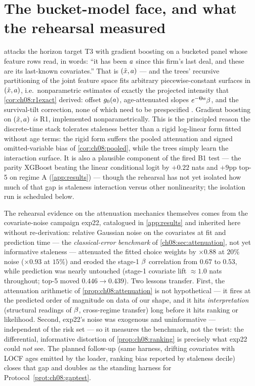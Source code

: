 \section{The bucket-model face, and what the rehearsal measured}
\label{ch08:sec:buckets}

 attacks the horizon target T3 with gradient boosting
on a bucketed panel whose feature rows read, in words: ``it has been
$a$ since this firm's last deal, and these are its last-known
covariates.'' That is $(\tilde{x}, a)$ --- and the trees'
recursive partitioning of the joint feature space fits arbitrary
piecewise-constant surfaces in $(\tilde{x}, a)$, i.e.\
nonparametric estimates of exactly the projected intensity that
\cref{cor:ch08:r1exact} derived: offset $g_0(a)$,
age-attenuated slopes $e^{-\Theta a}\beta$, and the survival-tilt
correction, none of which need to be prespecified
\citep{friedman2001,chenguestrin2016}. Gradient boosting on
$(\tilde{x}, a)$ \emph{is} R1, implemented nonparametrically.
This is the principled reason the discrete-time stack tolerates
staleness better than a rigid log-linear form fitted without age terms:
the rigid form suffers the pooled attenuation and signed
omitted-variable bias of \cref{cor:ch08:pooled}, while the trees simply
learn the interaction surface. It is also a plausible component of the
fired B1 test --- the parity XGBoost beating the linear conditional
logit by $+0.22$ nats and $+9$pp top-5 on regime A
(\cref{app:results}) --- though the rehearsal has not yet isolated how
much of that gap is staleness interaction versus other nonlinearity;
the isolation run is scheduled below.

The rehearsal evidence on the attenuation mechanics themselves comes
from the covariate-noise campaign exp22, catalogued in
\cref{app:results} and inherited here without re-derivation: relative
Gaussian noise on the covariates at fit and prediction time --- the
\emph{classical-error benchmark} of \cref{ch08:sec:attenuation}, not yet
informative staleness --- attenuated the fitted choice weights by
$\times 0.88$ at $20\%$ noise ($\times 0.93$ at $15\%$) and eroded the
stage-1 $\beta$ correlation from $0.67$ to $0.53$, while prediction was
nearly untouched (stage-1 covariate lift $\approx 1.0$ nats throughout;
top-5 moved $0.446 \to 0.439$). Two lessons transfer. First, the
attenuation arithmetic of \cref{prop:ch08:attenuation} is not
hypothetical --- it fires at the predicted order of magnitude on data of
our shape, and it hits \emph{interpretation} (structural readings of
$\beta$, cross-regime transfer) long before it hits ranking or
likelihood. Second, exp22's noise was exogenous and uninformative ---
independent of the risk set --- so it measures the benchmark, not the
twist: the differential, informative distortion of
\cref{prop:ch08:ranking} is precisely what exp22 could \emph{not} see.
The planned follow-up (same harness, drifting covariates with LOCF ages
emitted by the loader, ranking bias reported by staleness decile) closes
that gap and doubles as the standing harness for
Protocol~\ref{prot:ch08:gaptest}.

